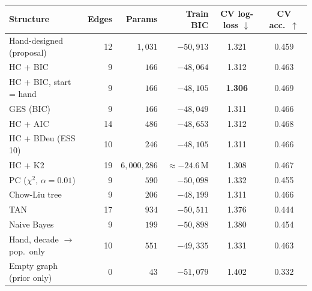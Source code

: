 \setlength{\tabcolsep}{4pt}
\begin{tabular}{lrrrcc}
\toprule
Structure & Edges & Params & Train BIC & CV log-loss $\downarrow$ & CV acc.\ $\uparrow$ \\
\midrule
Hand-designed (proposal) & 12 & $1{,}031$ & $-50{,}913$ & 1.321 & 0.459 \\
\midrule
HC + BIC & 9 & $166$ & $-48{,}064$ & 1.312 & 0.463 \\
HC + BIC, start = hand & 9 & $166$ & $-48{,}105$ & \textbf{1.306} & 0.469 \\
GES (BIC) & 9 & $166$ & $-48{,}049$ & 1.311 & 0.466 \\
HC + AIC & 14 & $486$ & $-48{,}653$ & 1.312 & 0.468 \\
HC + BDeu (ESS 10) & 10 & $246$ & $-48{,}105$ & 1.311 & 0.466 \\
HC + K2 & 19 & $6{,}000{,}286$ & $\approx -24.6\,\mathrm{M}$ & 1.308 & 0.467 \\
PC ($\chi^2$, $\alpha{=}0.01$) & 9 & $590$ & $-50{,}098$ & 1.332 & 0.455 \\
Chow-Liu tree & 9 & $206$ & $-48{,}199$ & 1.311 & 0.466 \\
TAN & 17 & $934$ & $-50{,}511$ & 1.376 & 0.444 \\
Naive Bayes & 9 & $199$ & $-50{,}898$ & 1.380 & 0.454 \\
\midrule
Hand, decade $\to$ pop.\ only & 10 & $551$ & $-49{,}335$ & 1.331 & 0.463 \\
Empty graph (prior only) & 0 & $43$ & $-51{,}079$ & 1.402 & 0.332 \\
\bottomrule
\end{tabular}
